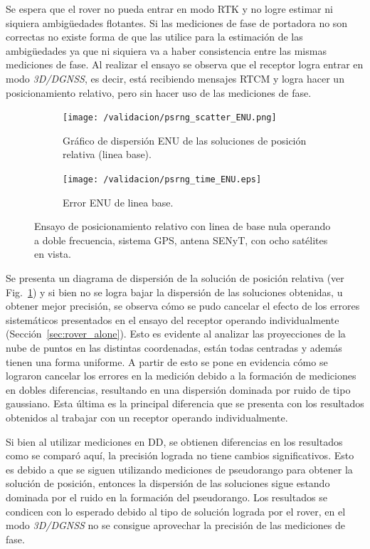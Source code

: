 \documentclass[a4paper,12pt,oneside,onecolumn,final,openright]{book}%
\begin{document}
	Se espera que el rover no pueda entrar en modo RTK y no logre estimar ni siquiera ambigüedades flotantes. Si las mediciones de fase de portadora no son correctas no existe forma de que las utilice para la estimación de las ambigüedades ya que ni siquiera va a haber consistencia entre las mismas mediciones de fase. Al realizar el ensayo se observa que el receptor logra entrar en modo \textit{3D/DGNSS}, es decir, está recibiendo mensajes RTCM y logra hacer un posicionamiento relativo, pero sin hacer uso de las mediciones de fase. 
\begin{figure}
\begin{subfigure}{1\linewidth}
\centering
  	\texttt{[image: /validacion/psrng\_scatter\_ENU.png]}
  	\caption{Gráfico de dispersión ENU de las soluciones de posición relativa (linea base).}
    \label{fig:scatter_psrng_DGNSS_Q}
\end{subfigure}


\begin{subfigure}{1\linewidth}
\centering
 	\texttt{[image: /validacion/psrng\_time\_ENU.eps]}
 	\caption{Error ENU de linea base.}
  	\label{fig:error_psrng_DGNSS_Q}

\end{subfigure}
\caption{Ensayo de posicionamiento relativo con linea de base nula operando a doble frecuencia, sistema GPS, antena SENyT, con ocho satélites en vista.}
\label{fig:ensayoDGNSS_psrng_Q}
\end{figure}

	Se presenta un diagrama de dispersión de la solución de posición relativa (ver Fig.~\ref{fig:scatter_psrng_DGNSS_Q}) y si bien no se logra bajar la dispersión de las soluciones obtenidas, u obtener mejor precisión, se observa cómo se pudo cancelar el efecto de los errores sistemáticos presentados en el ensayo del receptor operando individualmente (Sección~\ref{sec:rover_alone}). Esto es evidente al analizar las proyecciones de la nube de puntos en las distintas coordenadas, están todas centradas y además tienen una forma uniforme. A partir de esto se pone en evidencia cómo se lograron cancelar los errores en la medición debido a la formación de mediciones en dobles diferencias, resultando en una dispersión dominada por ruido de tipo gaussiano. Esta última es la principal diferencia que se presenta con los resultados obtenidos al trabajar con un receptor operando individualmente.
	
	Si bien al utilizar mediciones en DD, se obtienen diferencias en los resultados como se comparó aquí, la precisión lograda no tiene cambios significativos. Esto es debido a que se siguen utilizando mediciones de pseudorango para obtener la solución de posición, entonces la dispersión de las soluciones sigue estando dominada por el ruido en la formación del pseudorango. Los resultados se condicen con lo esperado debido al tipo de solución lograda por el rover, en el modo \textit{3D/DGNSS} no se consigue aprovechar la precisión de las mediciones de fase.
	
\end{document}
